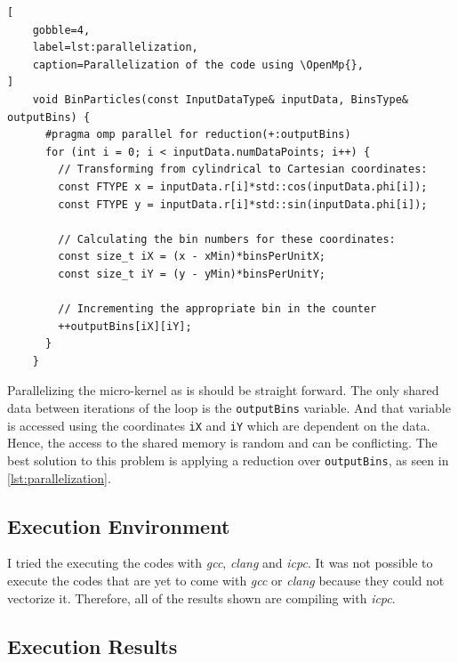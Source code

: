 \documentclass[
    12pt, %
]{fphw}
\newcommand{\tech}{\texttt}
\newcommand{\gcc}{\textit{gcc}}
\newcommand{\clang}{\textit{clang}}
\newcommand{\icpc}{\textit{icpc}}
\newcommand{\OpenMp}{\textit{OpenMp}}
\begin{document}
\begin{lstlisting}[
    gobble=4,
    label=lst:parallelization,
    caption=Parallelization of the code using \OpenMp{},
]
    void BinParticles(const InputDataType& inputData, BinsType& outputBins) {
      #pragma omp parallel for reduction(+:outputBins)
      for (int i = 0; i < inputData.numDataPoints; i++) { 
        // Transforming from cylindrical to Cartesian coordinates:
        const FTYPE x = inputData.r[i]*std::cos(inputData.phi[i]);
        const FTYPE y = inputData.r[i]*std::sin(inputData.phi[i]);

        // Calculating the bin numbers for these coordinates:
        const size_t iX = (x - xMin)*binsPerUnitX;
        const size_t iY = (y - yMin)*binsPerUnitY;

        // Incrementing the appropriate bin in the counter
        ++outputBins[iX][iY];
      }
    }

\end{lstlisting}

    Parallelizing the micro-kernel as is should be straight forward.
The only shared data between iterations of the loop is the \tech{outputBins} variable.
And that variable is accessed using the coordinates \tech{iX} and \tech{iY}
which are dependent on the data.
Hence, the access to the shared memory is random and can be conflicting.
The best solution to this problem is applying a reduction over \tech{outputBins},
as seen in \cref{lst:parallelization}.

\subsection{Execution Environment}

    I tried the executing the codes with \gcc{}, \clang{} and \icpc{}.
It was not possible to execute the codes that are yet to come with \gcc{} or \clang{}
because they could not vectorize it.
Therefore, all of the results shown are compiling with \icpc{}.

\subsection{Execution Results}
\end{document}

